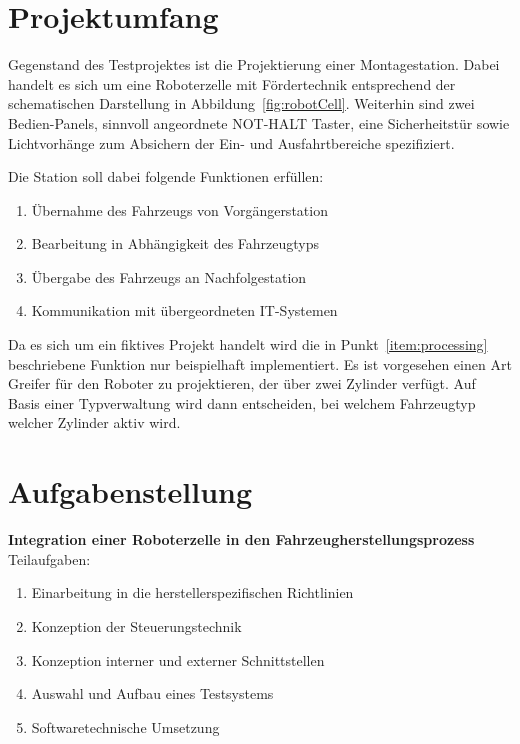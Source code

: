 \section{Projektumfang}
Gegenstand des Testprojektes ist die Projektierung einer Montagestation. Dabei handelt es sich um eine Roboterzelle mit Fördertechnik entsprechend der schematischen Darstellung in Abbildung~\ref{fig:robotCell}.
Weiterhin sind zwei Bedien-Panels, sinnvoll angeordnete NOT-HALT Taster, eine Sicherheitstür sowie Lichtvorhänge zum Absichern der Ein- und Ausfahrtbereiche spezifiziert.

Die Station soll dabei folgende Funktionen erfüllen:
\begin{enumerate}
	\itemsep0.05em
	\item Übernahme des Fahrzeugs von Vorgängerstation
	\item \label{item:processing}Bearbeitung in Abhängigkeit des Fahrzeugtyps
	\item Übergabe des Fahrzeugs an Nachfolgestation
	\item Kommunikation mit übergeordneten IT-Systemen
\end{enumerate}

Da es sich um ein fiktives Projekt handelt wird die in Punkt~\ref{item:processing} beschriebene Funktion nur beispielhaft implementiert. Es ist vorgesehen einen Art Greifer für den Roboter zu projektieren, der über zwei Zylinder verfügt. Auf Basis einer Typverwaltung wird dann entscheiden, bei welchem Fahrzeugtyp welcher Zylinder aktiv wird.

\section{Aufgabenstellung}

\textbf{Integration einer Roboterzelle in den Fahrzeugherstellungsprozess}\leer
Teilaufgaben:%
\begin{enumerate}
	\itemsep 0.05em
	\item Einarbeitung in die herstellerspezifischen Richtlinien
	\item Konzeption der Steuerungstechnik
	\item Konzeption interner und externer Schnittstellen
	\item Auswahl und Aufbau eines Testsystems
	\item Softwaretechnische Umsetzung
\end{enumerate}
